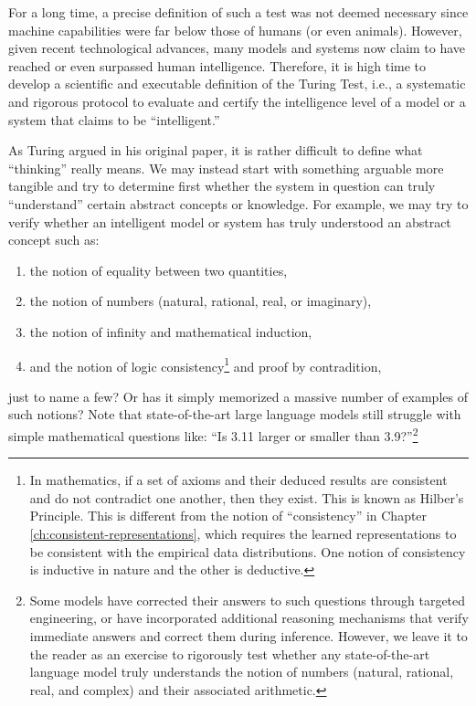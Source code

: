 \documentclass[../../book-main.tex]{subfiles}
\begin{document}
For a long time, a precise definition of such a test was not deemed
necessary since machine capabilities were far below those of humans
(or even animals). However, given recent technological advances, many
models and systems now claim to have reached or even surpassed human
intelligence. Therefore, it is high time to develop a scientific and
executable definition of the Turing Test, i.e., a systematic and
rigorous protocol to evaluate and certify the intelligence level of a
model or a system that claims to be ``intelligent.''

As Turing argued in his original paper, it is rather difficult
to define what ``thinking'' really means. We may instead start with 
something arguable more tangible and try to determine first whether the system 
in question can truly ``understand'' certain abstract concepts or knowledge. 
For example, we may try to verify whether an intelligent model or system has truly
understood an abstract concept such as:
\begin{enumerate}
    \item the notion of equality between two quantities,
    \item the notion of numbers (natural, rational, real, or imaginary),
    \item the notion of infinity and mathematical induction,
    \item  and the notion of logic consistency\footnote{In mathematics, if a set of axioms and their deduced results are consistent and 
    do not contradict one another, then they exist. This is known as Hilber's Principle. This is different from the 
    notion of ``consistency'' in Chapter \ref{ch:consistent-representations}, which requires the learned
    representations to be consistent with the empirical data distributions. One notion of consistency is inductive in nature 
    and the other is deductive.} and proof by contradition,
\end{enumerate}
just to name a few? Or has it simply memorized a massive number of
examples of such notions? Note that state-of-the-art large language
models still struggle with simple mathematical questions like: ``Is
3.11 larger or smaller than 3.9?''\footnote{Some models have
    corrected their answers to such questions through targeted
    engineering, or have incorporated additional reasoning mechanisms
    that verify immediate answers and correct them during inference.
    However, we leave it to the reader as an exercise to rigorously test
    whether any state-of-the-art language model truly understands the
    notion of numbers (natural, rational, real, and complex) and their
associated arithmetic.}
\end{document}
